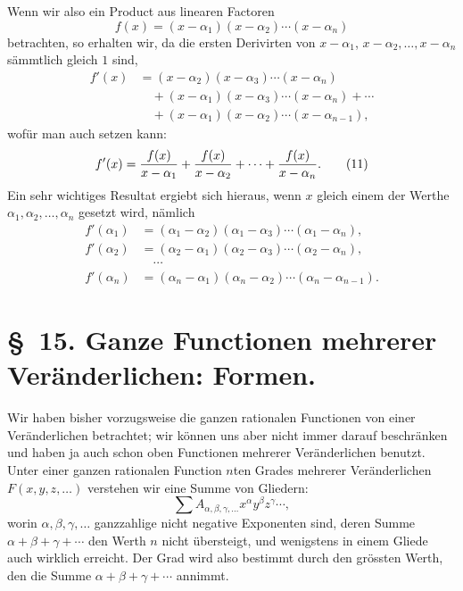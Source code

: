 \documentclass[11pt]{article}
\begin{document}
Wenn wir also ein Product aus linearen Factoren
\begin{equation}
 f(x)=(x-\alpha_1)(x-\alpha_2)\cdots(x-\alpha_n)
\tag{9}
\end{equation}
betrachten, so erhalten wir, da die ersten Derivirten von $x-\alpha_1$, $x-\alpha_2,\ldots,x-\alpha_n$ sämmtlich gleich $1$ sind,
\begin{equation}
\begin{aligned}
f'(x)&=(x-\alpha_2)(x-\alpha_3)\cdots(x-\alpha_n)\\
&\quad +(x-\alpha_1)(x-\alpha_3)\cdots(x-\alpha_n)+\cdots\\
&\quad +(x-\alpha_1)(x-\alpha_2)\cdots(x-\alpha_{n-1}),
\end{aligned}
\tag{10}
\end{equation}
wofür man auch setzen kann:
\begin{equation}
 f'(x)={f(x)\over x-\alpha_1}+{f(x)\over x-\alpha_2}+\cdots+{f(x)\over x-\alpha_n}.
\tag{11}
\end{equation}
Ein sehr wichtiges Resultat ergiebt sich hieraus, wenn $x$ gleich einem der Werthe $\alpha_1,\alpha_2,\ldots,\alpha_n$ gesetzt wird, nämlich
\begin{equation}
\begin{aligned}
 f'(\alpha_1)&=(\alpha_1-\alpha_2)(\alpha_1-\alpha_3)\cdots(\alpha_1-\alpha_n),\\
 f'(\alpha_2)&=(\alpha_2-\alpha_1)(\alpha_2-\alpha_3)\cdots(\alpha_2-\alpha_n),\\
 &\quad\cdots\\
 f'(\alpha_n)&=(\alpha_n-\alpha_1)(\alpha_n-\alpha_2)\cdots(\alpha_n-\alpha_{n-1}).
\end{aligned}
\tag{12}
\end{equation}

\section*{\S~15. Ganze Functionen mehrerer Veränderlichen: Formen.}

Wir haben bisher vorzugsweise die ganzen rationalen Functionen von einer Veränderlichen betrachtet; wir können uns aber nicht immer darauf beschränken und haben ja auch schon oben Functionen mehrerer Veränderlichen benutzt. Unter einer ganzen rationalen Function $n$ten Grades mehrerer Veränderlichen $F(x,y,z,\ldots)$ verstehen wir eine Summe von Gliedern:
\[
 \sum A_{\alpha,\beta,\gamma,\ldots}x^\alpha y^\beta z^\gamma\cdots,
\]
worin $\alpha,\beta,\gamma,\ldots$ ganzzahlige nicht negative Exponenten sind, deren Summe $\alpha+\beta+\gamma+\cdots$ den Werth $n$ nicht übersteigt, und wenigstens in einem Gliede auch wirklich erreicht. Der Grad wird also bestimmt durch den grössten Werth, den die Summe $\alpha+\beta+\gamma+\cdots$ annimmt.
\end{document}
